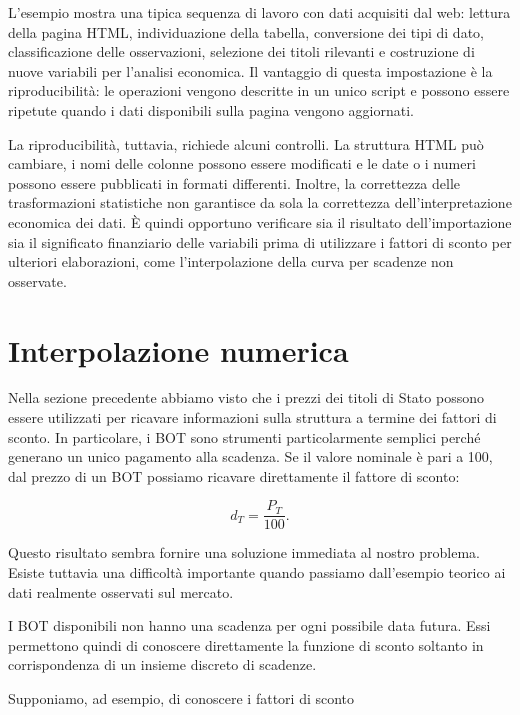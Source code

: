 L'esempio mostra una tipica sequenza di lavoro con dati acquisiti dal web: lettura della pagina HTML, individuazione della tabella, conversione dei tipi di dato, classificazione delle osservazioni, selezione dei titoli rilevanti e costruzione di nuove variabili per l'analisi economica. Il vantaggio di questa impostazione è la riproducibilità: le operazioni vengono descritte in un unico script e possono essere ripetute quando i dati disponibili sulla pagina vengono aggiornati.

La riproducibilità, tuttavia, richiede alcuni controlli. La struttura HTML può cambiare, i nomi delle colonne possono essere modificati e le date o i numeri possono essere pubblicati in formati differenti. Inoltre, la correttezza delle trasformazioni statistiche non garantisce da sola la correttezza dell'interpretazione economica dei dati. È quindi opportuno verificare sia il risultato dell'importazione sia il significato finanziario delle variabili prima di utilizzare i fattori di sconto per ulteriori elaborazioni, come l'interpolazione della curva per scadenze non osservate.

\section{Interpolazione numerica}
\label{sec:interpolazione}

Nella sezione precedente abbiamo visto che i prezzi dei titoli di Stato
possono essere utilizzati per ricavare informazioni sulla struttura a
termine dei fattori di sconto. In particolare, i BOT sono strumenti
particolarmente semplici perché generano un unico pagamento alla
scadenza. Se il valore nominale è pari a 100, dal prezzo di un BOT
possiamo ricavare direttamente il fattore di sconto:

\begin{equation*}
    d_T = \frac{P_T}{100}.
\end{equation*}

Questo risultato sembra fornire una soluzione immediata al nostro
problema. Esiste tuttavia una difficoltà importante quando passiamo
dall'esempio teorico ai dati realmente osservati sul mercato.

I BOT disponibili non hanno una scadenza per ogni possibile data
futura. Essi permettono quindi di conoscere direttamente la funzione
di sconto soltanto in corrispondenza di un insieme discreto di
scadenze.

Supponiamo, ad esempio, di conoscere i fattori di sconto

